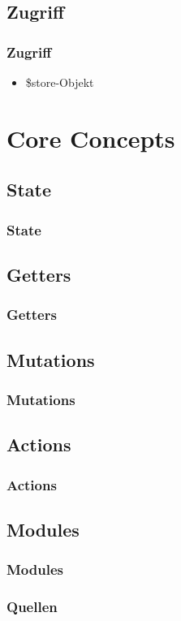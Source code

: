 \documentclass{beamer}
\begin{document}
\subsection{Zugriff}
\begin{frame}
    \frametitle{Zugriff}
    \begin{itemize}
        \item \$store-Objekt
    \end{itemize}
\end{frame}
\section{Core Concepts}
\subsection{State}
\begin{frame}
    \frametitle{State}
\end{frame}
\subsection{Getters}
\begin{frame}
    \frametitle{Getters}
\end{frame}
\subsection{Mutations}
\begin{frame}
    \frametitle{Mutations}
\end{frame}
\subsection{Actions}
\begin{frame}
    \frametitle{Actions}
\end{frame}
\subsection{Modules}
\begin{frame}
    \frametitle{Modules}
\end{frame}
\begin{frame}
    \frametitle{Quellen}
\end{frame}
\end{document}
